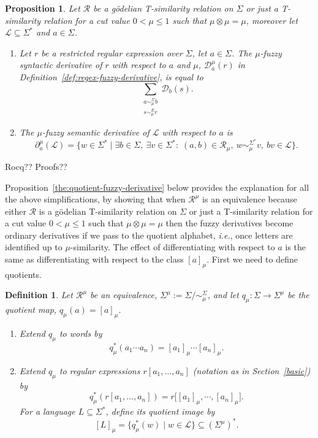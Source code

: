 \documentclass{article}
\newcommand{\cR}{{\mathcal R}}
\def\cut{\mu}
\newtheorem{definition}{Definition}[section]
\newtheorem{proposition}{Proposition}[section]
\begin{document}
\begin{proposition}\label{fuzzyderivativeGodel}
Let $\cR$ be a g\"odelian T-similarity relation on $\Sigma$ or just a T-similarity relation for a cut value $0 < \cut \le 1$ such that $\mu\otimes\mu=\mu$, moreover let $\mathcal{L}\subseteq\Sigma^*$ and $a\in\Sigma$. 
\begin{enumerate}
\item \label{def:regex-fuzzy-derivative-godel}
Let $r$ be a restricted regular expression over $\Sigma$, let $a\in\Sigma$. The $\mu$-fuzzy syntactic derivative  of $r$ with respect to $a$ and
$\cut$, $\mathcal D_a^\cut(r)$ in Definition~\ref{def:regex-fuzzy-derivative}, is equal to
\[  \sum\limits_{\substack{a\sim_\cut^\Sigma b\\ s\sim_\cut^E r}}
  \mathcal D_b(s).
\]
\item The \emph{$\cut$-fuzzy semantic 
derivative} of $\mathcal{L}$ with respect to $a$ is
$$
\partial_a^\cut(\mathcal{L})
=
\{w \in \Sigma^* \mid
  \exists b \in \Sigma,\ \exists v\in\Sigma^*
  :\;
  (a,b)\in\cR_\cut,\ w\sim_\cut^{\Sigma^*}v,\ bv\in\mathcal{L}
\}.
$$
\end{enumerate}
\end{proposition}
{\color{red} Rocq?? Proofs??}

Proposition~\ref{the:quotient-fuzzy-derivative} below provides the explanation for all the above simplifications, by showing that when $\cR^\mu$ is an equivalence because either $\cR$ is a g\"odelian T-similarity relation on $\Sigma$ or just a T-similarity relation for a cut value $0<\cut \le 1$ such that $\mu\otimes\mu=\mu$ then the fuzzy derivatives become ordinary derivatives if we pass to the quotient alphabet, {\em i.e.}, once letters are identified up to
$\cut$-similarity. The effect of differentiating with respect to $a$ is the same as
differentiating with respect to the class $[a]_\cut$. First we need to define quotients.


\begin{definition}\label{def:quotient-language-fuzzy}
Let $\cR^\mu$ be an equivalence, $\Sigma^\cut := \Sigma/{\sim_\cut^\Sigma}$, and let
$q_\cut:\Sigma\to\Sigma^\cut$ be the quotient map, $q_\cut(a)=[a]_\cut$.\begin{enumerate}
\item Extend $q_\cut$ to words by
\[
  q_\cut^*(a_1\cdots a_n) = [a_1]_\cut \cdots [a_n]_\cut.
\]
\item Extend $q_\cut$ to regular expressions $r[a_1,\ldots,a_n]$ (notation as in Section~\ref{basic}) by
\[
  q_\cut^*(r[a_1,\ldots,a_n]) = r\bigl[[a_1]_\cut, \cdots, [a_n]_\cut\bigr].
\]
For a language $ L \subseteq \Sigma^*$, define its quotient image by
\[
  [L]_\cut %
  = \{q_\cut^*(w)\mid w\in\mathcal L\}
  \subseteq (\Sigma^\cut)^*.
\]
\end{enumerate}
\end{definition}
\end{document}

